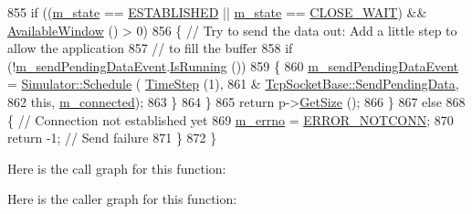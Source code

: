 \begin{DoxyCode}
855       \textcolor{keywordflow}{if} ((\hyperlink{classns3_1_1TcpSocketBase_a5db6f29272f23546e23320c06a681f3e}{m\_state} == \hyperlink{group__tcp_gga3929cdb47bdf159657fa24054aa5ca03a1826ad465d372319d1db905886de3743}{ESTABLISHED} || \hyperlink{classns3_1_1TcpSocketBase_a5db6f29272f23546e23320c06a681f3e}{m\_state} == 
      \hyperlink{group__tcp_gga3929cdb47bdf159657fa24054aa5ca03a812907d056aeb79789f671d657f076a3}{CLOSE\_WAIT}) && \hyperlink{classns3_1_1TcpSocketBase_add825047dd7c82046d42087e29b7c5b7}{AvailableWindow} () > 0)
856         \{ \textcolor{comment}{// Try to send the data out: Add a little step to allow the application}
857           \textcolor{comment}{// to fill the buffer}
858           \textcolor{keywordflow}{if} (!\hyperlink{classns3_1_1TcpSocketBase_a84be5c63b5ebf8e2452b43f9def59cab}{m\_sendPendingDataEvent}.\hyperlink{classns3_1_1EventId_aabf8476d1a080c199ea0c6aa9ccea372}{IsRunning} ())
859             \{
860               \hyperlink{classns3_1_1TcpSocketBase_a84be5c63b5ebf8e2452b43f9def59cab}{m\_sendPendingDataEvent} = \hyperlink{classns3_1_1Simulator_a671882c894a08af4a5e91181bf1eec13}{Simulator::Schedule} (
      \hyperlink{group__time_ga464a3c1cbb458c6c3ed3bd5ce9506758}{TimeStep} (1),
861                                                             &
      \hyperlink{classns3_1_1TcpSocketBase_a129ac0ec5fc399fa7c5552c615ae6562}{TcpSocketBase::SendPendingData},
862                                                             \textcolor{keyword}{this}, \hyperlink{classns3_1_1TcpSocketBase_aa52df78102ea7c1c6b432ad9486ed0c2}{m\_connected});
863             \}
864         \}
865       \textcolor{keywordflow}{return} p->\hyperlink{classns3_1_1Packet_a462855c9929954d4301a4edfe55f4f1c}{GetSize} ();
866     \}
867   \textcolor{keywordflow}{else}
868     \{ \textcolor{comment}{// Connection not established yet}
869       \hyperlink{classns3_1_1TcpSocketBase_a592901b6c992843533af1b7c1c7f9474}{m\_errno} = \hyperlink{classns3_1_1Socket_ada1328c5ae0c28cb2a982caf8f6d6ccaaeb1fd23c1f4965b496786597125bf0f6}{ERROR\_NOTCONN};
870       \textcolor{keywordflow}{return} -1; \textcolor{comment}{// Send failure}
871     \}
872 \}
\end{DoxyCode}


Here is the call graph for this function\+:




Here is the caller graph for this function\+:


